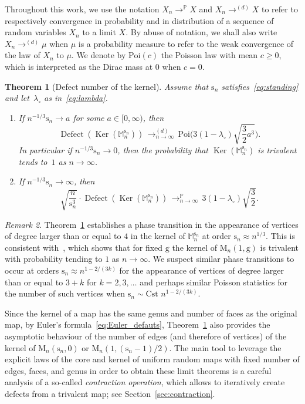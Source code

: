 \documentclass[10pt]{amsart}
\theoremstyle{plain}
\newtheorem{theorem}{Theorem}
\theoremstyle{definition}
\theoremstyle{remark}
\newtheorem{remark}[theorem]{Remark}
\renewcommand{\P}{\mathbb{P}}
\newcommand{\Map}{\mathrm{M}}
\newcommand{\Mapb}{\mathbb{M}}
\newcommand{\gen}{\mathrm{g}}
\newcommand{\spar}{\mathrm{s}}
\DeclareMathOperator{\Ker}{Ker}
\DeclareMathOperator{\Defect}{Defect}
\newcommand{\cvloi}[1][n]{\,\mathop{\longrightarrow}^{(d)}_{#1 \to \infty}\,}
\newcommand{\cvproba}[1][n]{\,\mathop{\longrightarrow}^{\P}_{#1 \to \infty}\,}
\begin{document}
Throughout this work, we use the notation $X_n \displaystyle\mathop{\to}^\P X$ and $X_n \displaystyle\mathop{\to}^{(d)} X$ to refer to respectively convergence in probability and in distribution of a sequence of random variables $X_n$ to a limit $X$. By abuse of notation, we shall also write $X_n \displaystyle\mathop{\to}^{(d)} \mu$ when $\mu$ is a probability measure to refer to the weak convergence of the law of $X_n$ to $\mu$.
We denote by $\mathrm{Poi}(c)$ the Poisson law with mean $c \ge 0$, which is interpreted as the Dirac mass at $0$ when $c=0$.

\begin{theorem}[Defect number of the kernel]
\label{thm:defauts_ker}
Assume that $\spar_n$ satisfies~\eqref{eq:standing} and let~$\lambda_\circ$ as in~\eqref{eq:lambda}.
\begin{enumerate}
\item\label{thm:defauts_ker-Poisson} If $n^{-1/3} \spar_n \to a$ for some $a \in [0,\infty)$, then
\[
\Defect(\Ker(\Mapb_n^{\spar_{n}})) \cvloi \mathrm{Poi} \biggl(3 (1-\lambda_{\circ}) \sqrt{\frac{3}{2} a^3} \biggr).
\]
In particular if $n^{-1/3} \spar_n \to 0$, then the probability that $\Ker(\Mapb_n^{\spar_{n}})$ is trivalent tends to~$1$ as $n \to \infty$.

\item\label{thm:defauts_ker-Gaussien} If $n^{-1/3} \spar_n \to \infty$, then
\[
\sqrt{\frac{n}{\spar_n^{3}}} \cdot \Defect(\Ker(\Mapb_n^{\spar_{n}})) \cvproba 3 (1-\lambda_{\circ}) \sqrt{\frac{3}{2}}.
\]
\end{enumerate}
\end{theorem}

\begin{remark}
Theorem~\ref{thm:defauts_ker} establishes a phase transition in the appearance of vertices of degree larger than or equal to $4$ in the kernel of $ \Mapb_n^{\spar_n}$ at order $ \spar_n \approx n^{1/3}$. This is consistent with~\cite[Lem.\,3]{Cha10}, which shows that for fixed $\gen$ the kernel of $ \Map_{n}(1,\gen)$ is trivalent with probability tending to $1$ as $n \rightarrow \infty$. We suspect similar phase transitions to occur at orders $ \spar_n \approx n^{1- 2/(3k)}$ for the appearance of vertices of degree larger than or equal to $3+k$ for $k = 2,3, \dots$ and perhaps similar Poisson statistics for the number of such vertices when $ \spar_n \sim \text{Cst } n^{1- 2/(3k)}$.
\end{remark}

Since the kernel of a map has the same genus and number of faces as the original map, by Euler's formula~\eqref{eq:Euler_defauts}, Theorem~\ref{thm:defauts_ker} also provides the asymptotic behaviour of the number of edges (and therefore of vertices) of the kernel of $ \Map_{n}(\spar_{n},0)$ or \hbox{$\Map_{n}(1, (\spar_{n}-1)/2)$}.
The main tool to leverage the explicit laws of the core and kernel of uniform random maps with fixed number of edges, faces, and genus in order to obtain these limit theorems is a careful analysis of a so-called \emph{contraction operation}, which allows to iteratively create defects from a trivalent map; see Section~\ref{sec:contraction}.
\end{document}

